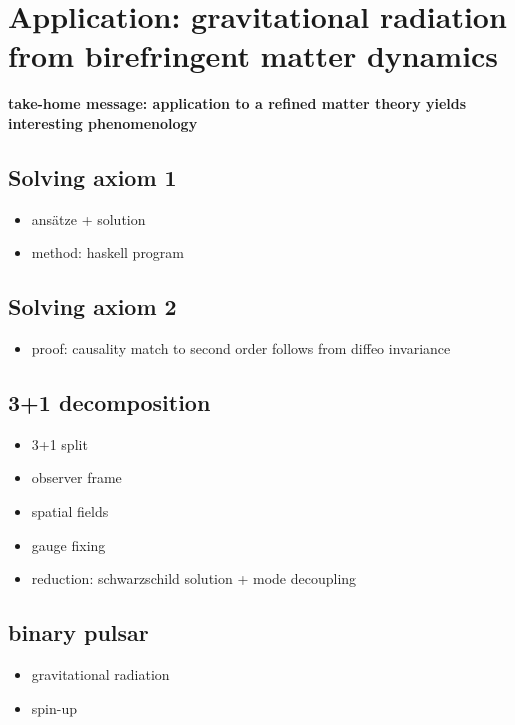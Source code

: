 \chapter{Application: gravitational radiation from birefringent matter dynamics}
\label{chapter_weak_area}

\textbf{take-home message: application to a refined matter theory yields interesting phenomenology}

\section{Solving axiom 1}
\begin{itemize}
\item ansätze + solution
\item method: haskell program
\end{itemize}

\section{Solving axiom 2}
\begin{itemize}
\item proof: causality match to second order follows from diffeo invariance
\end{itemize}

\section{3+1 decomposition}
\begin{itemize}
\item 3+1 split
\item observer frame
\item spatial fields
\item gauge fixing
\item reduction: schwarzschild solution + mode decoupling
\end{itemize}

\section{binary pulsar}
\begin{itemize}
\item gravitational radiation
\item spin-up
\end{itemize}

